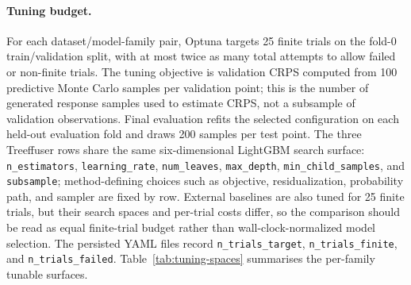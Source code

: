 \documentclass{tpm2026}
\begin{document}
\paragraph{Tuning budget.} For each dataset/model-family pair, Optuna targets 25 finite trials on the fold-0 train/validation split, with at most twice as many total attempts to allow failed or non-finite trials. The tuning objective is validation CRPS computed from 100 predictive Monte Carlo samples per validation point; this is the number of generated response samples used to estimate CRPS, not a subsample of validation observations. Final evaluation refits the selected configuration on each held-out evaluation fold and draws 200 samples per test point. The three Treeffuser rows share the same six-dimensional LightGBM search surface: \texttt{n\_estimators}, \texttt{learning\_rate}, \texttt{num\_leaves}, \texttt{max\_depth}, \texttt{min\_child\_samples}, and \texttt{subsample}; method-defining choices such as objective, residualization, probability path, and sampler are fixed by row. External baselines are also tuned for 25 finite trials, but their search spaces and per-trial costs differ, so the comparison should be read as equal finite-trial budget rather than wall-clock-normalized model selection. The persisted YAML files record \texttt{n\_trials\_target}, \texttt{n\_trials\_finite}, and \texttt{n\_trials\_failed}. Table~\ref{tab:tuning-spaces} summarises the per-family tunable surfaces.
\end{document}
